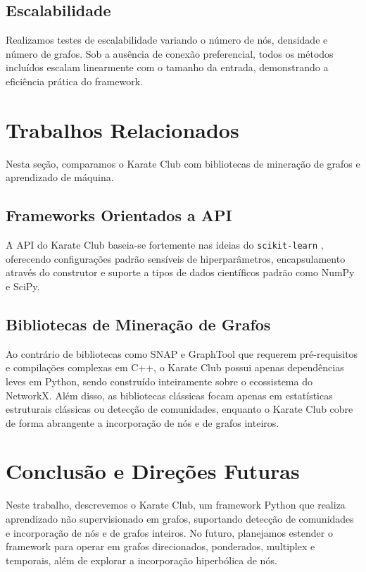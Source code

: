 \documentclass[sigconf]{acmart}
\begin{document}
\subsection{Escalabilidade}

Realizamos testes de escalabilidade variando o número de nós, densidade e número de grafos. Sob a ausência de conexão preferencial, todos os métodos incluídos escalam linearmente com o tamanho da entrada, demonstrando a eficiência prática do framework.

\section{Trabalhos Relacionados}

Nesta seção, comparamos o Karate Club com bibliotecas de mineração de grafos e aprendizado de máquina.

\subsection{Frameworks Orientados a API}

A API do Karate Club baseia-se fortemente nas ideias do \texttt{scikit-learn} \cite{ScikitLearn}, oferecendo configurações padrão sensíveis de hiperparâmetros, encapsulamento através do construtor e suporte a tipos de dados científicos padrão como NumPy e SciPy.

\subsection{Bibliotecas de Mineração de Grafos}

Ao contrário de bibliotecas como SNAP e GraphTool que requerem pré-requisitos e compilações complexas em C++, o Karate Club possui apenas dependências leves em Python, sendo construído inteiramente sobre o ecossistema do NetworkX. Além disso, as bibliotecas clássicas focam apenas em estatísticas estruturais clássicas ou detecção de comunidades, enquanto o Karate Club cobre de forma abrangente a incorporação de nós e de grafos inteiros.

\section{Conclusão e Direções Futuras}

Neste trabalho, descrevemos o Karate Club, um framework Python que realiza aprendizado não supervisionado em grafos, suportando detecção de comunidades e incorporação de nós e de grafos inteiros. No futuro, planejamos estender o framework para operar em grafos direcionados, ponderados, multiplex e temporais, além de explorar a incorporação hiperbólica de nós.
\end{document}
